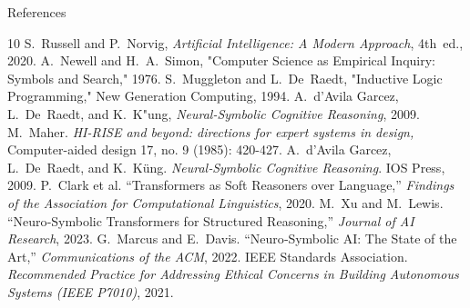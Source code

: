\documentclass[german,10pt]{beamer}
\begin{document}
\begin{frame}{References}

\begin{thebibliography}{10}
 {\tiny
\beamertemplatebookbibitems
{}
  S.~Russell and P.~Norvig,
  \emph{Artificial Intelligence: A Modern Approach}, 4th~ed., 2020.
  A.~Newell and H.~A.~Simon,
  "Computer Science as Empirical Inquiry: Symbols and Search," 1976.
  S.~Muggleton and L.~De~Raedt,
  "Inductive Logic Programming," New Generation Computing, 1994.
  A.~d'Avila Garcez, L.~De~Raedt, and K.~K"ung,
  \emph{Neural-Symbolic Cognitive Reasoning}, 2009.
    M.~Maher. \emph{HI-RISE and beyond: directions for expert systems in design,} Computer-aided design 17, no. 9 (1985): 420-427.
      A.~d'Avila Garcez, L.~De~Raedt, and K.~K\"ung. \emph{Neural‐Symbolic Cognitive Reasoning}. IOS Press, 2009.
      P.~Clark et al. “Transformers as Soft Reasoners over Language,” \emph{Findings of the Association for Computational Linguistics}, 2020.
      M.~Xu and M.~Lewis. “Neuro‐Symbolic Transformers for Structured Reasoning,” \emph{Journal of AI Research}, 2023.
      G.~Marcus and E.~Davis. “Neuro‐Symbolic AI: The State of the Art,” \emph{Communications of the ACM}, 2022.
      IEEE Standards Association. \emph{Recommended Practice for Addressing Ethical Concerns in Building Autonomous Systems (IEEE P7010)}, 2021.
      }
\end{thebibliography}

\end{frame}
\end{document}
